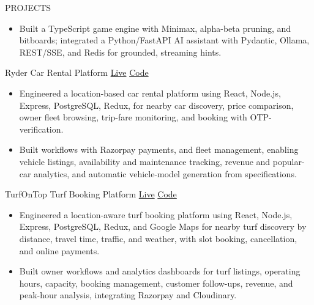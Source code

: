 \documentclass{resume} %
\begin{document}
\begin{rSection}{PROJECTS}
\begin{itemize}
\item Built a TypeScript game engine with Minimax, alpha-beta pruning, and bitboards; integrated a Python/FastAPI AI assistant with Pydantic, Ollama, REST/SSE, and Redis for grounded, streaming hints.

\end{itemize}

\projectHeading
{Ryder}
{Car Rental Platform}
{\href{https://ryder-bice.vercel.app/}{Live}}
{\href{https://github.com/Riyanshverma/ryder}{Code}}

\begin{itemize}
\itemsep -3pt {}

\item Engineered a location-based car rental platform using React, Node.js, Express, PostgreSQL, Redux, for nearby car discovery, price comparison, owner fleet browsing, trip-fare monitoring, and booking with OTP-verification.

\item Built workflows with Razorpay payments, and fleet management, enabling vehicle listings, availability and maintenance tracking, revenue and popular-car analytics, and automatic vehicle-model generation from specifications.

\end{itemize}

\projectHeading
{TurfOnTop}
{Turf Booking Platform}
{\href{https://turf-on-top.vercel.app/}{Live}}
{\href{https://github.com/Riyanshverma/TurfOnTop}{Code}}

\begin{itemize}
\itemsep -3pt {}

\item Engineered a location-aware turf booking platform using React, Node.js, Express, PostgreSQL, Redux, and Google Maps for nearby turf discovery by distance, travel time, traffic, and weather, with slot booking, cancellation, and online payments.

\item Built owner workflows and analytics dashboards for turf listings, operating hours, capacity, booking management, customer follow-ups, revenue, and peak-hour analysis, integrating Razorpay and Cloudinary.

\end{itemize}

\end{rSection}

\end{document}
